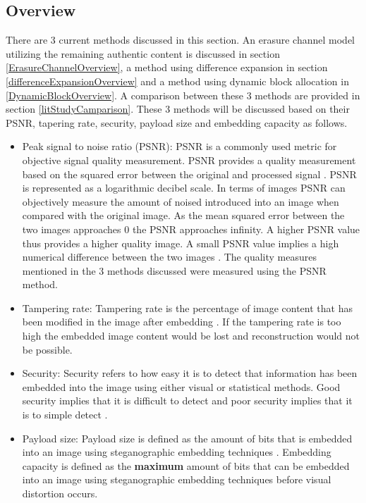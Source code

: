 \documentclass[12pt]{article}
\begin{document}
\subsection{Overview}
There are 3 current methods discussed in this section. An erasure channel model utilizing the remaining authentic content is discussed in section \ref{ErasureChannelOverview}, a method using difference expansion in section \ref{differenceExpansionOverview} and a method using dynamic block allocation in \ref{DynamicBlockOverview}. 
A comparison between these 3 methods are provided in section \ref{litStudyCamparison}.
These 3 methods will be discussed based on their PSNR, tapering rate, security, payload size and embedding capacity as follows.

\begin{itemize}
	\item Peak signal to noise ratio (PSNR): PSNR is a commonly used metric for objective signal quality measurement. PSNR provides a quality measurement based on the squared error between the original and processed signal \cite{turaga2004no}. PSNR is represented as a logarithmic decibel scale. In terms of images PSNR can objectively measure the amount of noised introduced into an image when compared with the original image. 
	As the mean squared error between the two images approaches 0 the PSNR approaches infinity. A higher PSNR value thus provides a higher quality image. 
	A small PSNR value implies a high numerical difference between the two images \cite{hore2010image}.  
	The quality measures mentioned in the 3 methods discussed were measured using the PSNR method. 
	\item Tampering rate: Tampering rate is the percentage of image content that has been modified in the image after embedding \cite{qian2011image}.
	If the tampering rate is too high the embedded image content would be lost and reconstruction would not be possible.
	\item Security: Security refers to how easy it is to detect that information has been embedded into the image using either visual or statistical methods. Good security implies that it is difficult to detect and poor security implies that it is to simple detect \cite{fridrich2009steganography}.
	\item Payload size: Payload size is defined as the amount of bits that is embedded into an image using steganographic embedding techniques \cite{chen2010high}. Embedding capacity is defined as the \textbf{maximum} amount of bits that can be embedded into an image using steganographic embedding techniques before visual distortion occurs.
\end{itemize}
\end{document}
